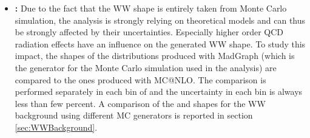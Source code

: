 \begin{itemize}
%
\item {\bf {}:} 
  Due to the fact that the WW shape is entirely taken from Monte Carlo simulation, the analysis is strongly
  relying on theoretical models and can thus be strongly affected by their uncertainties. Especially higher 
  order QCD radiation effects have an influence on the generated WW shape. To study this impact, the shapes 
  of the distributions produced with MadGraph (which is the generator for the Monte Carlo simulation used in the analysis) are compared to the ones produced with MC@NLO. The comparison is performed separately in each bin of \pth and the uncertainty in each bin is always less than few percent. A comparison of the \mll and \mt shapes for the WW background using different MC generators is reported in section \ref{sec:WWBackground}.


\end{itemize} 

